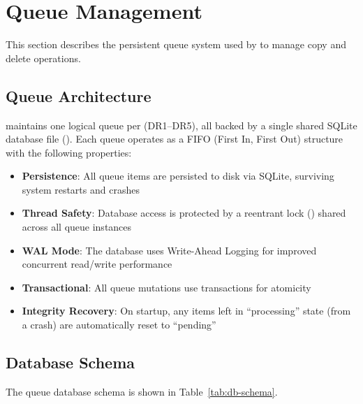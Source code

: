 
\chapter{Queue Management}
\label{sec:queue-management}

This section describes the persistent queue system used by \SC{} to manage copy and delete operations.

\section{Queue Architecture}

\SC{} maintains one logical queue per \DR{} (DR1--DR5), all backed by a single shared SQLite database file (). Each queue operates as a FIFO (First In, First Out) structure with the following properties:

\begin{itemize}
    \item \textbf{Persistence}: All queue items are persisted to disk via SQLite, surviving system restarts and crashes
    \item \textbf{Thread Safety}: Database access is protected by a reentrant lock () shared across all queue instances
    \item \textbf{WAL Mode}: The database uses Write-Ahead Logging for improved concurrent read/write performance
    \item \textbf{Transactional}: All queue mutations use  transactions for atomicity
    \item \textbf{Integrity Recovery}: On startup, any items left in ``processing'' state (from a crash) are automatically reset to ``pending''
\end{itemize}

\section{Database Schema}

The queue database schema is shown in Table~\ref{tab:db-schema}.

